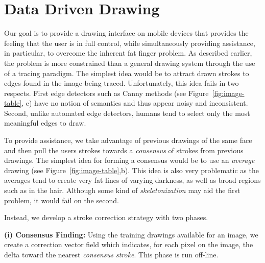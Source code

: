 \section{Data Driven Drawing}



Our goal is to provide a drawing interface on mobile devices that provides the feeling that the user is in full control, while simultaneously providing assistance, in particular, to overcome the inherent fat finger problem. As described earlier, the problem is more constrained than a general drawing system through the use of a tracing paradigm. The simplest idea would be to attract drawn strokes to edges found in the image being traced. Unfortunately, this idea fails in two respects. First edge detectors such as Canny methods (see Figure~\ref{fig:image-table}, e) have no notion of semantics and thus appear noisy and inconsistent. Second, unlike automated edge detectors, humans tend to select only the most meaningful edges to draw.


To provide assistance, we take advantage of previous drawings of the same face and then pull the users strokes towards a {\em consensus} of strokes from previous drawings. The simplest idea for forming a consensus would be to use an {\em average} drawing (see Figure~\ref{fig:image-table},b). This idea is also very problematic as the averages tend to create very fat lines of varying darkness, as well as broad regions such as in the hair. Although some kind of {\em skeletonization} may aid the first problem, it would fail on the second.

\vspace{+0.45in}
Instead, we develop a stroke correction strategy with two phases.

\textbf{(i) Consensus Finding:} Using the training drawings available for an image, we create a correction vector field which indicates, for each pixel on the image, the delta toward the nearest {\em consensus stroke}.  This phase is run off-line.

